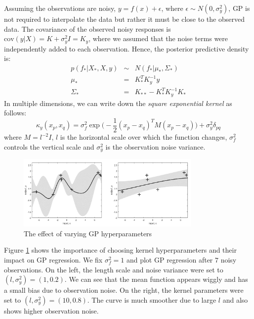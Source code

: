 Assuming the observations are noisy, $y=f(x)+\epsilon$, where $\epsilon \sim N(0,\sigma_{y}^{2})$, GP is not required to interpolate the data but rather it must be close to the observed data. The covariance of the observed noisy responses is $\mathrm{cov}(y|X) = K + \sigma_{y}^{2}I = K_{y}$, where we assumed that the noise terms were independently added to each observation. Hence, the posterior predictive density is:
\begin{eqnarray}
    p(f_{\ast}|X_{\ast}, X, y) &\sim& N(f_{\ast}|\mu_{\ast},\Sigma_{\ast})\\
    \mu_{\ast} &=& K_{\ast}^{T}K_{y}^{-1}y\\
    \Sigma_{\ast} &=& K_{\ast\ast} - K_{\ast}^{T}K_{y}^{-1}K_{\ast}
\end{eqnarray}
In multiple dimensions, we can write down the \textit{square exponential kernel} as follows:
\begin{equation}
    \kappa_{y}(x_p, x_q) = \sigma_{f}^{2}\exp\big(-\frac{1}{2}(x_p-x_q)^{T}M(x_p-x_q)\big) + \sigma_{y}^{2}\delta_{pq}
\end{equation}
where $M = l^{-2}I$, $l$ is the horizontal scale over which the function changes, $\sigma_{f}^{2}$ controls the vertical scale and $\sigma_{y}^{2}$ is the observation noise variance. 

\begin{figure}[tbhp]
    \centering
    \includegraphics[width=0.8\textwidth, trim={10 10 10 10}]{figures/gp34.png}
    \caption{The effect of varying GP hyperparameters}
    \label{fig:gp34}
\end{figure}

Figure \ref{fig:gp34} shows the importance of choosing kernel hyperparameters and their impact  on GP regression. We fix $\sigma_{f}^{2} = 1$ and plot GP regression after $7$ noisy observations. On the left, the length scale and noise variance were set to $(l,\sigma_{y}^{2}) = (1, 0.2)$. We can see that the mean function appears wiggly and has a small bias due to observation noise. On the right, the kernel parameters were set to $(l,\sigma_{y}^{2}) = (10,0.8)$. The curve is much smoother due to large $l$ and also shows higher observation noise.\\

